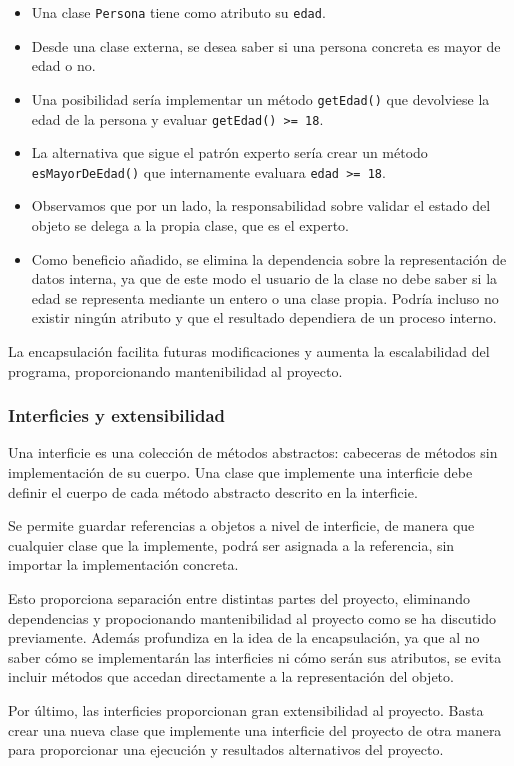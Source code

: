 \documentclass[12pt,a4paper,openright,oneside]{article}
\numberwithin{equation}{section}
\theoremstyle{definition}
\begin{document}
\begin{itemize}
\item Una clase \texttt{Persona} tiene como atributo su \texttt{edad}. 
\item Desde una clase externa, se desea saber si una persona concreta es mayor de edad o no.
\item Una posibilidad sería implementar un método \texttt{getEdad()} que devolviese la edad de la persona y evaluar \texttt{getEdad() >=  18}.
\item La alternativa que sigue el patrón experto sería crear un método \texttt{esMayorDeEdad()} que internamente evaluara \texttt{edad >=  18}. 
\item Observamos que por un lado, la responsabilidad sobre validar el estado del objeto se delega a la propia clase, que es el experto.
\item Como beneficio añadido, se elimina la dependencia sobre la representación de datos interna, ya que de este modo el usuario de la clase no debe saber si la edad se representa mediante un entero o una clase propia. Podría incluso no existir ningún atributo y que el resultado dependiera de un proceso interno. 
\end{itemize}

La encapsulación facilita futuras modificaciones y aumenta la escalabilidad del programa, proporcionando mantenibilidad al proyecto.

\subsubsection{Interficies y extensibilidad}
Una interficie es una colección de métodos abstractos: cabeceras de métodos sin implementación de su cuerpo. Una clase que implemente una interficie debe definir el cuerpo de cada método abstracto descrito en la interficie.

Se permite guardar referencias a objetos a nivel de interficie, de manera que cualquier clase que la implemente, podrá ser asignada a la referencia, sin importar la implementación concreta. 

Esto proporciona separación entre distintas partes del proyecto, eliminando dependencias y propocionando mantenibilidad al proyecto como se ha discutido previamente. Además profundiza en la idea de la encapsulación, ya que al no saber cómo se implementarán las interficies ni cómo serán sus atributos, se evita incluir métodos que accedan directamente a la representación del objeto.

Por último, las interficies proporcionan gran extensibilidad al proyecto. Basta crear una nueva clase que implemente una interficie del proyecto de otra manera para proporcionar una ejecución y resultados alternativos del proyecto.
\end{document}
